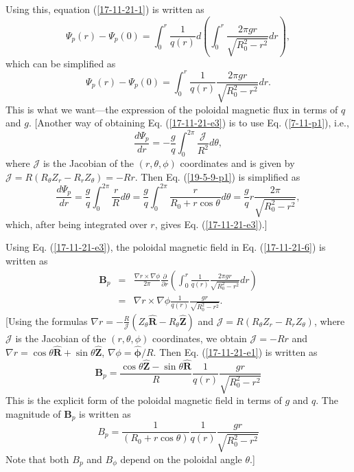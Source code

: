 \documentclass{article}
\newcommand{\tmmathbf}[1]{\ensuremath{\boldsymbol{#1}}}
\begin{document}
Using this, equation (\ref{17-11-21-1}) is written as
\begin{equation}
  \Psi_p (r) - \Psi_p (0) = \int_0^r \frac{1}{q (r)} d \left( \int_0^r \frac{2
  \pi g r}{\sqrt{R_0^2 - r^2}} d r \right),
\end{equation}
which can be simplified as
\begin{equation}
  \label{17-11-21-e3} \Psi_p (r) - \Psi_p (0) = \int_0^r \frac{1}{q (r)} 
  \frac{2 \pi g r}{\sqrt{R_0^2 - r^2}} d r.
\end{equation}
This is what we want---the expression of the poloidal magnetic flux in terms
of $q$ and $g$. [Another way of obtaining Eq. (\ref{17-11-21-e3}) is to use
Eq. (\ref{7-11-p1}), i.e.,
\begin{equation}
  \label{19-5-9-p1} \frac{d \Psi_p}{d r} = - \frac{g}{q} \int_0^{2 \pi}
  \frac{\mathcal{J}}{R^2} d \theta,
\end{equation}
where $\mathcal{J}$ is the Jacobian of the $(r, \theta, \phi)$ coordinates and
is given by $\mathcal{J} = R (R_{\theta} Z_r - R_r Z_{\theta}) = - R r$. Then
Eq. (\ref{19-5-9-p1}) is simplified as
\begin{equation}
  \frac{d \Psi_p}{d r} = \frac{g}{q} \int_0^{2 \pi} \frac{r}{R^{}} d \theta =
  \frac{g}{q} \int_0^{2 \pi} \frac{r}{R_0 + r \cos \theta^{}} d \theta =
  \frac{g}{q} r \frac{2 \pi}{\sqrt{R_0^2 - r^2}},
\end{equation}
which, after being integrated over $r$, gives Eq. (\ref{17-11-21-e3}).]

Using Eq. (\ref{17-11-21-e3}), the poloidal magnetic field in Eq.
(\ref{17-11-21-6}) is written as
\begin{eqnarray}
  \mathbf{B}_p & = & \frac{\nabla r \times \nabla \phi}{2 \pi}
  \frac{\partial}{\partial r} \left( \int_0^r \frac{1}{q (r)}  \frac{2 \pi g
  r}{\sqrt{R_0^2 - r^2}} d r \right) \nonumber\\
  & = & \nabla r \times \nabla \phi \frac{1}{q (r)}  \frac{g r}{\sqrt{R_0^2 -
  r^2}} .  \label{17-11-21-e1}
\end{eqnarray}
[Using the formulas $\nabla r = - \frac{R}{\mathcal{J}} (Z_{\theta}
\hat{\mathbf{R}} - R_{\theta} \hat{\mathbf{Z}})$ and $\mathcal{J} = R
(R_{\theta} Z_r - R_r Z_{\theta})$, where $\mathcal{J}$ is the Jacobian of the
$(r, \theta, \phi)$ coordinates, we obtain $\mathcal{J} = - R r$ and $\nabla r
= \cos \theta \hat{\mathbf{R}} + \sin \theta \hat{\mathbf{Z}}$, $\nabla \phi =
\hat{\tmmathbf{\phi}} / R$. Then Eq. (\ref{17-11-21-e1}) is written as
\begin{equation}
  \mathbf{B}_p = \frac{\cos \theta \hat{\mathbf{Z}} - \sin \theta
  \hat{\mathbf{R}}}{R}  \frac{1}{q (r)}  \frac{g r}{\sqrt{R_0^2 - r^2}}
\end{equation}
This is the explicit form of the poloidal magnetic field in terms of $g$ and
$q$. The magnitude of $\mathbf{B}_p$ is written as
\begin{equation}
  B_p = \frac{1}{(R_0 + r \cos \theta)}  \frac{1}{q (r)}  \frac{g
  r}{\sqrt{R_0^2 - r^2}}
\end{equation}
Note that both $B_p$ and $B_{\phi}$ depend on the poloidal angle $\theta$.]
\end{document}
